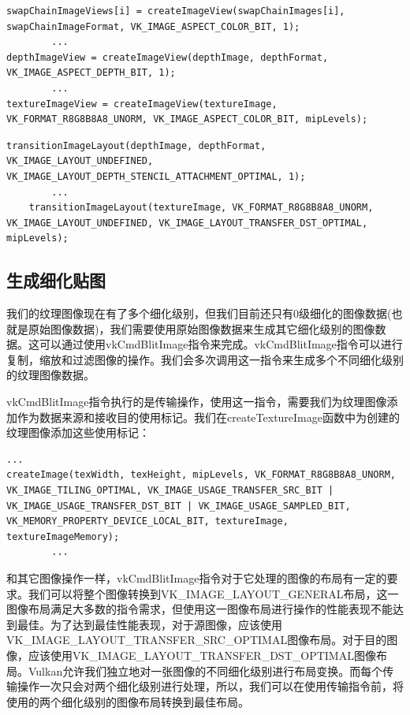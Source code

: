 \documentclass{ctexart}
\begin{document}
\begin{lstlisting}[language={[ANSI]C}]
swapChainImageViews[i] = createImageView(swapChainImages[i], swapChainImageFormat, VK_IMAGE_ASPECT_COLOR_BIT, 1);
		...
depthImageView = createImageView(depthImage, depthFormat, VK_IMAGE_ASPECT_DEPTH_BIT, 1);
		...
textureImageView = createImageView(textureImage, VK_FORMAT_R8G8B8A8_UNORM, VK_IMAGE_ASPECT_COLOR_BIT, mipLevels);
\end{lstlisting}

\begin{lstlisting}[language={[ANSI]C}]
transitionImageLayout(depthImage, depthFormat, VK_IMAGE_LAYOUT_UNDEFINED,
VK_IMAGE_LAYOUT_DEPTH_STENCIL_ATTACHMENT_OPTIMAL, 1);
		...
	transitionImageLayout(textureImage, VK_FORMAT_R8G8B8A8_UNORM, VK_IMAGE_LAYOUT_UNDEFINED, VK_IMAGE_LAYOUT_TRANSFER_DST_OPTIMAL, mipLevels);
\end{lstlisting}

\subsection{生成细化贴图}

我们的纹理图像现在有了多个细化级别，但我们目前还只有0级细化的图像数据(也就是原始图像数据)，我们需要使用原始图像数据来生成其它细化级别的图像数据。这可以通过使用vkCmdBlitImage指令来完成。vkCmdBlitImage指令可以进行复制，缩放和过滤图像的操作。我们会多次调用这一指令来生成多个不同细化级别的纹理图像数据。

vkCmdBlitImage指令执行的是传输操作，使用这一指令，需要我们为纹理图像添加作为数据来源和接收目的使用标记。我们在createTextureImage函数中为创建的纹理图像添加这些使用标记：

\begin{lstlisting}[language={[ANSI]C}]
		...
createImage(texWidth, texHeight, mipLevels, VK_FORMAT_R8G8B8A8_UNORM, VK_IMAGE_TILING_OPTIMAL, VK_IMAGE_USAGE_TRANSFER_SRC_BIT | VK_IMAGE_USAGE_TRANSFER_DST_BIT | VK_IMAGE_USAGE_SAMPLED_BIT, VK_MEMORY_PROPERTY_DEVICE_LOCAL_BIT, textureImage, textureImageMemory);
		...
\end{lstlisting}

和其它图像操作一样，vkCmdBlitImage指令对于它处理的图像的布局有一定的要求。我们可以将整个图像转换到VK\_IMAGE\_LAYOUT\_GENERAL布局，这一图像布局满足大多数的指令需求，但使用这一图像布局进行操作的性能表现不能达到最佳。为了达到最佳性能表现，对于源图像，应该使用VK\_IMAGE\_LAYOUT\_TRANSFER\_SRC\_OPTIMAL图像布局。对于目的图像，应该使用VK\_IMAGE\_LAYOUT\_TRANSFER\_DST\_OPTIMAL图像布局。Vulkan允许我们独立地对一张图像的不同细化级别进行布局变换。而每个传输操作一次只会对两个细化级别进行处理，所以，我们可以在使用传输指令前，将使用的两个细化级别的图像布局转换到最佳布局。
\end{document}
